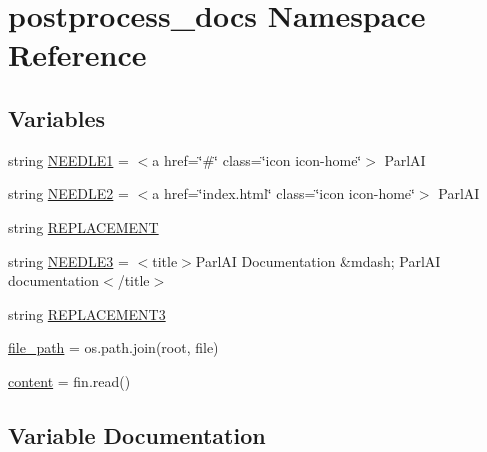 \hypertarget{namespacepostprocess__docs}{}\section{postprocess\+\_\+docs Namespace Reference}
\label{namespacepostprocess__docs}
\subsection*{Variables}
\begin{DoxyCompactItemize}
\item 
string \hyperlink{namespacepostprocess__docs_aadfb0c7a8fbb247f4019a90179a067d1}{N\+E\+E\+D\+L\+E1} = \textquotesingle{}$<$a href=\char`\"{}\#\char`\"{} class=\char`\"{}icon icon-\/home\char`\"{}$>$ Parl\+AI\textquotesingle{}
\item 
string \hyperlink{namespacepostprocess__docs_a97cdce480c1561c31f016431dc253817}{N\+E\+E\+D\+L\+E2} = \textquotesingle{}$<$a href=\char`\"{}index.\+html\char`\"{} class=\char`\"{}icon icon-\/home\char`\"{}$>$ Parl\+AI\textquotesingle{}
\item 
string \hyperlink{namespacepostprocess__docs_a0fae407424395eaf4e19b4b523e33edf}{R\+E\+P\+L\+A\+C\+E\+M\+E\+NT}
\item 
string \hyperlink{namespacepostprocess__docs_a490a1b3fb379b8e6e7431086fe509f6b}{N\+E\+E\+D\+L\+E3} = \textquotesingle{}$<$title$>$Parl\+AI Documentation \&mdash; Parl\+AI documentation$<$/title$>$\textquotesingle{}
\item 
string \hyperlink{namespacepostprocess__docs_a9c51c0d75affeba51b8f310bb7fddf7b}{R\+E\+P\+L\+A\+C\+E\+M\+E\+N\+T3}
\item 
\hyperlink{namespacepostprocess__docs_a889f9a8eed613997e6e3ea9ae5035ab7}{file\+\_\+path} = os.\+path.\+join(root, file)
\item 
\hyperlink{namespacepostprocess__docs_ae1bc6708d5bff1f8df885bf4edc54366}{content} = fin.\+read()
\end{DoxyCompactItemize}


\subsection{Variable Documentation}
\mbox{\label{namespacepostprocess__docs_ae1bc6708d5bff1f8df885bf4edc54366}} 
